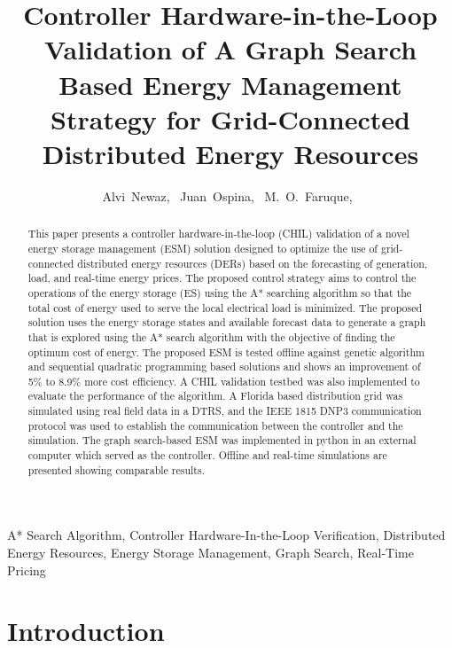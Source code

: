 \documentclass[journal]{IEEEtran}
\begin{document}
\title{Controller Hardware-in-the-Loop Validation of A Graph Search Based Energy Management Strategy for Grid-Connected Distributed Energy Resources}

\author{ Alvi~Newaz,~
Juan~Ospina,~
     M.~O.~Faruque,~
        }%
        
\maketitle
\begin{abstract}
This paper presents a controller hardware-in-the-loop (CHIL) validation of a novel energy storage management (ESM) solution designed to optimize the use of grid-connected distributed energy resources (DERs) based on the forecasting of generation, load, and real-time energy prices. The proposed control strategy aims to control the operations of the energy storage (ES) using the A* searching algorithm so that the total cost of energy used to serve the local electrical load is minimized. The proposed solution uses the energy storage states and available forecast data to generate a graph that is explored using the A* search algorithm with the objective of finding the optimum cost of energy. The proposed ESM is tested offline against genetic algorithm and sequential quadratic programming based solutions and shows an improvement of 5\% to 8.9\% more cost efficiency. A CHIL validation testbed was also implemented to evaluate the performance of the algorithm. A Florida based distribution grid was simulated using real field data in a DTRS, and the IEEE 1815 DNP3 communication protocol was used to establish the communication between the controller and the simulation. The graph search-based ESM was implemented in python in an external computer which served as the controller. Offline and real-time simulations are presented showing comparable results.  
\end{abstract}
                                         
\begin{IEEEkeywords}
A* Search Algorithm, Controller Hardware-In-the-Loop Verification, Distributed Energy Resources, Energy Storage Management, Graph Search, Real-Time Pricing
\end{IEEEkeywords}

\IEEEpeerreviewmaketitle

\section{Introduction}

\end{document}
